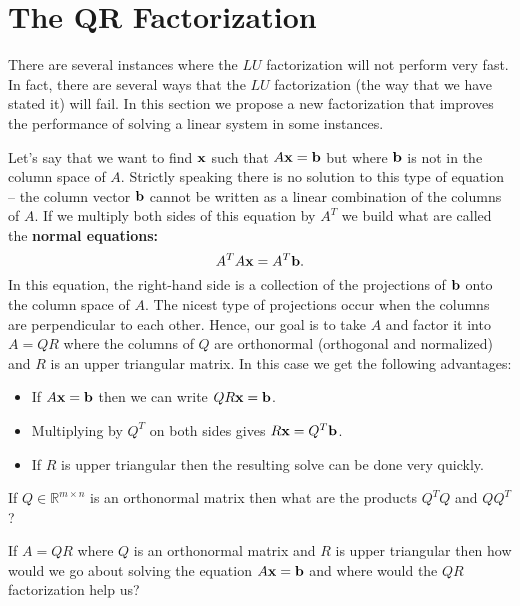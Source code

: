 \newpage\section{The QR Factorization}
There are several instances where the $LU$ factorization will not perform very fast.  In
fact, there are several ways that the $LU$ factorization (the way that we have stated it)
will fail.  In this section we propose a new factorization that improves the performance
of solving a linear system in some instances.

Let's say that we want to find ${\bf x}$ such that $A {\bf x} =
{\bf b}$ but where ${\bf b}$ is not in the column space of $A$.  Strictly speaking there is no
solution to this type of equation -- the column vector ${\bf b}$ cannot be written as a linear
combination of the columns of $A$.  If we multiply both sides of this equation by $A^T$ we
build what are called the {\bf normal equations:}
\[ A^T A {\bf x} = A^T {\bf b}. \]
In this equation, the right-hand side is a collection of the projections of ${\bf b}$ onto the
column space of $A$.  The nicest type of projections occur when the columns are
perpendicular to each other.  Hence, our goal is to take $A$ and factor it into $A = QR$
where the columns of $Q$ are orthonormal (orthogonal and normalized) and $R$ is an upper
triangular matrix.  In this case we get the following advantages:
\begin{itemize}
    \item If $A {\bf x} = {\bf b}$ then we can write $QR {\bf x} = {\bf b}$.
    \item Multiplying by $Q^T$ on both sides gives $R {\bf x} = Q^T {\bf b}$.
    \item If $R$ is upper triangular then the resulting solve can be done very quickly.
\end{itemize}

\begin{problem}
    If $Q \in \mathbb{R}^{m \times n}$ is an orthonormal matrix then what are the products
    $Q^TQ$ and $QQ^T$?  
\end{problem}

\begin{problem}
    If $A  = QR$ where $Q$ is an orthonormal matrix and $R$ is upper triangular then how
    would we go about solving the equation $A{\bf x} = {\bf b}$ and where would the $QR$
    factorization help us?
\end{problem}

